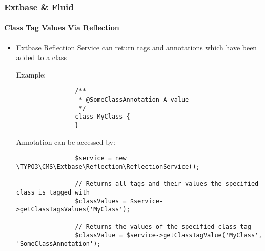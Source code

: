 \begin{frame}[fragile]
	\frametitle{Extbase \& Fluid}
	\framesubtitle{Class Tag Values Via Reflection}

	\lstset{
		basicstyle=\tiny\ttfamily
	}

	\begin{itemize}
		\item Extbase Reflection Service can return tags and annotations which have been added to a class\newline

			Example:
			\begin{lstlisting}
				/**
				 * @SomeClassAnnotation A value
				 */
				class MyClass {
				}
			\end{lstlisting}

			Annotation can be accessed by:
			\begin{lstlisting}
				$service = new \TYPO3\CMS\Extbase\Reflection\ReflectionService();

				// Returns all tags and their values the specified class is tagged with
				$classValues = $service->getClassTagsValues('MyClass');

				// Returns the values of the specified class tag
				$classValue = $service->getClassTagValue('MyClass', 'SomeClassAnnotation');
			\end{lstlisting}

	\end{itemize}

\end{frame}

